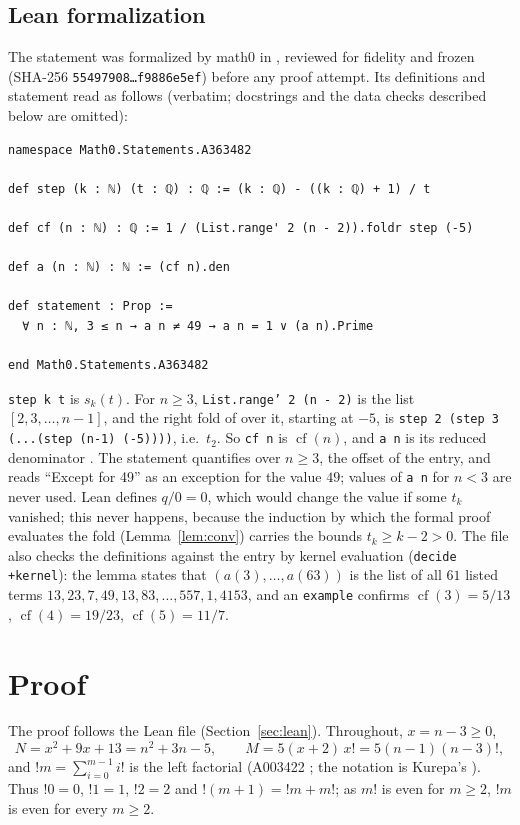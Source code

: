 \documentclass[11pt]{amsart}
\theoremstyle{plain}
\theoremstyle{definition}
\newcommand{\lf}{\mathop{!}}
\DeclareMathOperator{\cf}{cf}
\begin{document}
\subsection*{Lean formalization}
The statement was formalized by math0 in , reviewed for fidelity and frozen (SHA-256 \texttt{55497908\ldots f9886e5ef}) before any proof attempt. Its definitions and statement read as follows (verbatim; docstrings and the data checks described below are omitted):
\begin{lstlisting}
namespace Math0.Statements.A363482

def step (k : ℕ) (t : ℚ) : ℚ := (k : ℚ) - ((k : ℚ) + 1) / t

def cf (n : ℕ) : ℚ := 1 / (List.range' 2 (n - 2)).foldr step (-5)

def a (n : ℕ) : ℕ := (cf n).den

def statement : Prop :=
  ∀ n : ℕ, 3 ≤ n → a n ≠ 49 → a n = 1 ∨ (a n).Prime

end Math0.Statements.A363482
\end{lstlisting}
\texttt{step k t} is $s_k(t)$. For $n\ge3$, \texttt{List.range' 2 (n - 2)} is the list $[2,3,\dots,n-1]$, and the right fold of  over it, starting at $-5$, is \texttt{step 2 (step 3 (...(step (n-1) (-5))))}, i.e.\ $t_2$. So \texttt{cf n} is $\cf(n)$, and \texttt{a n} is its reduced denominator . The statement quantifies over $n\ge3$, the offset of the entry, and reads ``Except for 49'' as an exception for the value $49$; values of \texttt{a n} for $n<3$ are never used.
Lean defines $q/0=0$, which would change the value if some $t_k$ vanished; this never happens, because the induction by which the formal proof evaluates the fold (Lemma~\ref{lem:conv}) carries the bounds $t_k\ge k-2>0$.
The file also checks the definitions against the entry by kernel evaluation (\texttt{decide +kernel}): the lemma  states that $(a(3),\dots,a(63))$ is the list of all $61$ listed terms $13,23,7,49,13,83,\dots,557,1,4153$, and an \texttt{example} confirms $\cf(3)=5/13$, $\cf(4)=19/23$, $\cf(5)=11/7$.

\section{Proof}\label{sec:proof}

The proof follows the Lean file  (Section~\ref{sec:lean}). Throughout, $x=n-3\ge0$,
\[
  N=x^2+9x+13=n^2+3n-5,\qquad M=5(x+2)\,x!=5(n-1)(n-3)!,
\]
and $\lf m=\sum_{i=0}^{m-1}i!$ is the left factorial (A003422 \cite{A003422}; the notation is Kurepa's \cite{Kurepa}). Thus $\lf0=0$, $\lf1=1$, $\lf2=2$ and $\lf(m+1)=\lf m+m!$; as $m!$ is even for $m\ge2$, $\lf m$ is even for every $m\ge2$.
\end{document}
